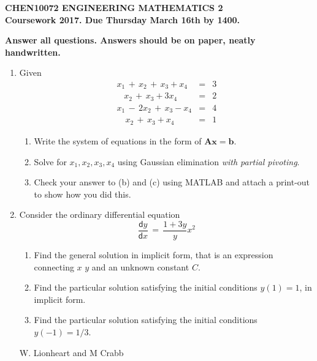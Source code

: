 \documentclass[12pt]{article}
\def\bA{\mathbf{A}}
\newcommand{\dif}{\mathsf{d}}
\begin{document}
\begin{center}{\bf\large
CHEN10072 ENGINEERING MATHEMATICS 2
\\
Coursework 2017. Due Thursday March 16th by 1400. 
}
\end{center}
\begin{center}{\bf
Answer all questions. Answers should be on paper, neatly handwritten.
}
\end{center}

\begin{enumerate}

\item 
Given
\vspace{-0.5cm}
\begin{eqnarray*}
x_1\,+\,x_2\,+\,x_3 + x_4&=&3\\
\,\,\,\,\,x_2\,+\,x_3 + 3x_4&=&2\\
x_1\,-\,2x_2\,+\,x_3 - x_4&=&4\\
\,\,\,\,\,\,x_2\,+\,x_3 + x_4&=&1
\end{eqnarray*}
            \begin{enumerate}
            \item Write the system of  equations in the form of $\bA \mathbf{x}=\mathbf{b}$.
             
            \item  Solve for $x_1,x_2,x_3,x_4$ using Gaussian elimination {\em with partial  pivoting}.
            \item Check your answer to (b) and (c) using  MATLAB and attach a print-out to show how you did this.
    \end{enumerate}
	

\item
Consider the ordinary differential equation
$$ \frac{\dif y}{\dif x}\,=\,  \frac{1+3y}{y} x^2 $$
\begin{enumerate}
\item
Find the general solution in implicit form, that is an expression connecting  $x$ $y$ and an unknown constant $C$.
\item Find the particular solution satisfying the initial conditions $y(1)=1$,  in implicit form. 
\item Find the particular solution satisfying the initial conditions $y(-1)=1/3$. 
\end{enumerate}
\vspace{5cm}
\tiny{W. Lionheart and M Crabb}



\end{enumerate}
\end{document}
